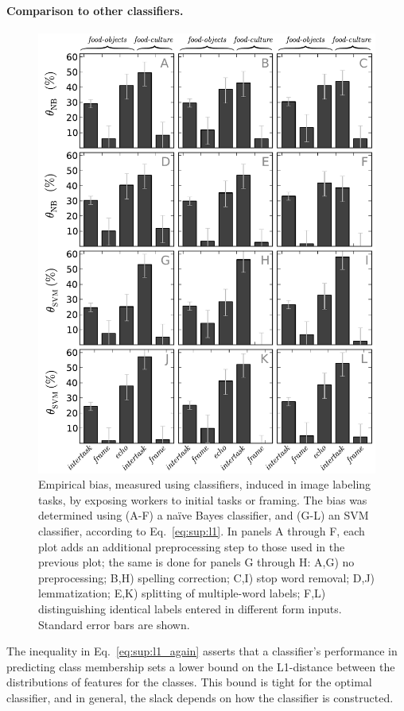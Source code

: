 \documentclass[12pt]{article}
\begin{document}
\paragraph{Comparison to other classifiers.} 

\begin{figure}
	\centering
	\includegraphics[scale=0.75]{figs/theta_sup.pdf}
	\caption{
		Empirical bias, measured using classifiers, induced in image 
		labeling tasks, by exposing workers to initial tasks or framing. 
		The bias was determined using (A-F) a na\"ive Bayes classifier, and 
		(G-L) an SVM classifier, according to Eq.~\ref{eq:sup:l1}.
		In panels A through F, each plot adds an additional
		preprocessing step to those used in the previous plot; the same is 
		done for panels G through H: A,G) no 
		preprocessing; B,H) spelling correction; C,I) stop word removal; 
		D,J) lemmatization; E,K) splitting of multiple-word labels; 
		F,L) distinguishing identical labels entered in different form inputs.
		Standard error bars are shown.
	}
	\label{fig:theta_sup}
\end{figure}
The inequality in Eq.~\ref{eq:sup:l1_again}
asserts that a classifier's performance in predicting class membership
sets a lower bound on the L1-distance between the distributions of features 
for the classes.
This bound is tight for the optimal classifier, and in general, the slack
depends on how the classifier is constructed.
\end{document}
